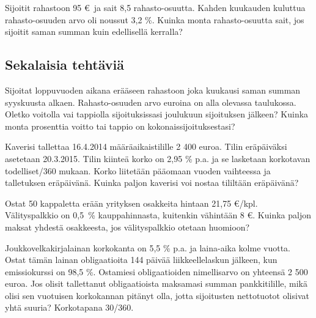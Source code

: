 \documentclass{article}\usepackage[]{graphicx}\usepackage[]{color}
\begin{document}
\begin{question} Sijoitit rahastoon 95 \euro \  ja sait 8{,}5 rahasto-osuutta. Kahden kuukauden kuluttua rahasto-osuuden arvo oli noussut 3{,}2 \%. Kuinka monta rahasto-osuutta sait, jos sijoitit saman summan kuin edellisellä kerralla?

\end{question}

\subsection*{Sekalaisia tehtäviä}

\begin{question} Sijoitat loppuvuoden aikana erääseen rahastoon joka kuukausi saman summan syyskuusta alkaen. Rahasto-osuuden arvo euroina on alla olevassa taulukossa. Oletko voitolla vai tappiolla sijoituksissasi joulukuun sijoituksen jälkeen? Kuinka monta prosenttia voitto tai tappio on kokonaissijoituksestasi?
\end{question}\begin{solution}\end{solution}

\begin{question} Kaverisi tallettaa 16.4.2014 määräaikaistilille 2 400 euroa. Tilin eräpäiväksi asetetaan 20.3.2015. Tilin kiinteä korko on 2{,}95 \% p.a. ja se lasketaan korkotavan todelliset/360 mukaan. Korko liitetään pääomaan vuoden vaihteessa ja talletuksen eräpäivänä. Kuinka paljon kaverisi voi nostaa tililtään eräpäivänä?

\end{question}\begin{solution}\end{solution}

\begin{question} Ostat 50 kappaletta erään yrityksen osakkeita hintaan 21{,}75 \euro/kpl. Välityspalkkio on 0{,}5~\% kauppahinnasta, kuitenkin vähintään 8 \euro. Kuinka paljon maksat yhdestä osakkeesta, jos välityspalkkio otetaan huomioon?

\end{question}

\begin{solution}\end{solution}\begin{question} Joukkovelkakirjalainan korkokanta on 5{,}5 \% p.a. ja laina-aika kolme vuotta. Ostat tämän lainan obligaatioita 144 päivää liikkeellelaskun jälkeen, kun emissiokurssi on 98{,}5 \%. Ostamiesi obligaatioiden nimellisarvo on yhteensä 2 500 euroa. Jos olisit tallettanut obligaatioista maksamasi summan pankkitilille, mikä olisi sen vuotuisen korkokannan pitänyt olla, jotta sijoitusten nettotuotot olisivat yhtä suuria? Korkotapana 30/360.

\end{question}\begin{solution}\end{solution}
\end{document}
